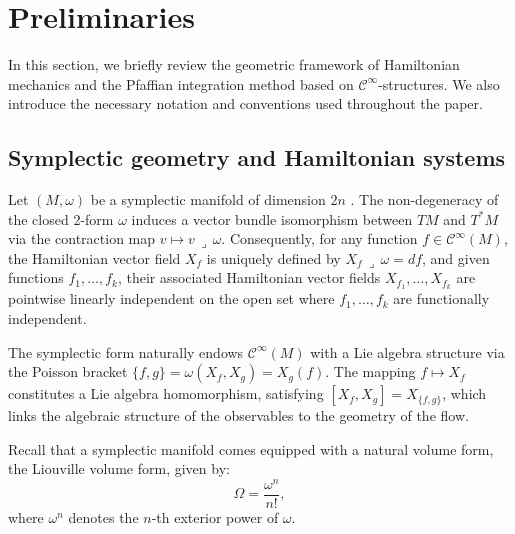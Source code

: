 \documentclass{article}
\theoremstyle{remark}
\theoremstyle{definition}
\newcommand{\cinf}{$\mathcal{C}^{\infty}$}
\newcommand{\contract}{\,\lrcorner\,}
\begin{document}
\section{Preliminaries}\label{sec:preliminaries}
In this section, we briefly review the geometric framework of Hamiltonian mechanics and the Pfaffian integration method based on \cinf-structures. We also introduce the necessary notation and conventions used throughout the paper.

\subsection{Symplectic geometry and Hamiltonian systems}
Let $(M, \omega)$ be a symplectic manifold of dimension $2n$ \cite{Arnold3,Arnold2,Zhao1}. The non-degeneracy of the closed 2-form $\omega$ induces a vector bundle isomorphism between $TM$ and $T^*M$ via the contraction map $v \mapsto v \contract \omega$. Consequently, for any function $f \in \mathcal{C}^{\infty}(M)$, the Hamiltonian vector field $X_f$ is uniquely defined by $X_f \contract \omega = df$, and given functions $f_1, \dots, f_k$, their associated Hamiltonian vector fields $X_{f_1}, \dots, X_{f_k}$ are pointwise linearly independent on the open set where $f_1,\dots,f_k$ are functionally independent.

The symplectic form naturally endows $\mathcal{C}^{\infty}(M)$ with a Lie algebra structure via the Poisson bracket $\{f, g\} = \omega(X_f, X_g) = X_g(f)$. The mapping $f \mapsto X_f$ constitutes a Lie algebra homomorphism, satisfying $[X_f, X_g] = X_{\{f, g\}}$, which links the algebraic structure of the observables to the geometry of the flow.

Recall that a symplectic manifold comes equipped with a natural volume form, the Liouville volume form, given by:
\begin{equation}\label{liouvilleform}
    \Omega = \frac{\omega^n}{n!},
\end{equation}
where $\omega^n$ denotes the $n$-th exterior power of $\omega$.
\end{document}
